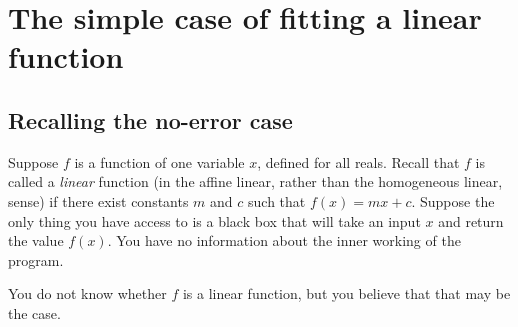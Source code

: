 \documentclass[10pt]{amsart}
\begin{document}
\section{The simple case of fitting a linear function}

\subsection{Recalling the no-error case}

Suppose $f$ is a function of one variable $x$, defined for all
reals. Recall that $f$ is called a {\em linear} function (in the
affine linear, rather than the homogeneous linear, sense) if there
exist constants $m$ and $c$ such that $f(x) = mx + c$. Suppose the
only thing you have access to is a black box that will take an input
$x$ and return the value $f(x)$. You have no information about the
inner working of the program.

You do not know whether $f$ is a linear function, but you believe that
that may be the case. 
\end{document}
